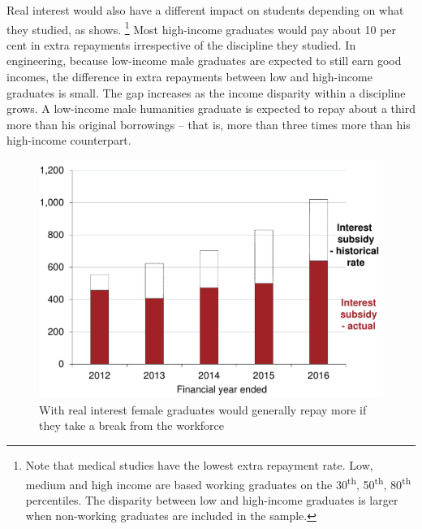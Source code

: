 \documentclass[embargoed]{grattan}
\begin{document}
Real interest would also have a different impact on students depending on what they studied, as  shows.%
\footnote{Note that medical studies have the lowest extra repayment rate.
Low, medium and high income are based working graduates on the 30\textsuperscript{th}, 50\textsuperscript{th}, 80\textsuperscript{th} percentiles.
The disparity between low and high-income graduates is larger when non-working graduates are included in the sample.} Most high-income graduates would pay about 10 per cent in extra repayments irrespective of the discipline they studied.
In engineering, because low-income male graduates are expected to still earn good incomes, the difference in extra repayments between low and high-income graduates is small.
The gap increases as the income disparity within a discipline grows.
A low-income male humanities graduate is expected to repay about a third more than his original borrowings -- that is, more than three times more than his high-income counterpart.

\begin{figure}
\caption{With real interest female graduates would generally repay more if they take a break from the workforce}\label{fig:fig15-with-real-interest-female-grads-would-repay-more-if-they-took-break-from-workforce}


\includegraphics[page=15]{atlas/Chartpack.pdf}
\end{figure}
\end{document}
